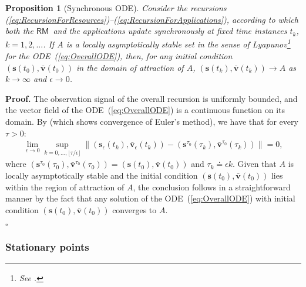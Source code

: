 \documentclass[letter,11pt]{article}
\newtheorem{proposition}{Proposition}[section]
\newenvironment{proof}{\textbf{Proof.}}{$\square$\\}
\begin{document}
\begin{proposition}[Synchronous ODE]		\label{Pr:LAS}
Consider the recursions (\ref{eq:RecursionForResources})--(\ref{eq:RecursionForApplications}), according to which both the {$\mathsf{RM}$}\ and the applications update synchronously at fixed time instances $t_k$, $k=1,2,...$. If $A$ is a locally asymptotically stable set in the sense of Lyapunov\footnote{See \cite[Definition~3.1]{Khalil92}.} for the ODE~(\ref{eq:OverallODE}), then, for any initial condition $({\mathbf{s}}(t_0),{\bar{\mathbf{v}}}(t_0))$ in the domain of attraction of $A$, $({\mathbf{s}}(t_k),{\bar{\mathbf{v}}}(t_k))\to{A}$ as $k\to\infty$ and $\epsilon\to{0}$.
\end{proposition}
\begin{proof}
  The observation signal of the overall recursion is uniformly bounded, and the vector field of the ODE~(\ref{eq:OverallODE}) is a continuous function on its domain. By \cite[Theorem~1.1]{Iserles09} (which shows convergence of Euler's method), we have that for every $\tau>0$:
  \begin{eqnarray*}
  \lim_{\epsilon\to{0}}\sup_{k=0,...,\lfloor{\tau/\epsilon}\rfloor}\|({\mathbf{s}}_{\epsilon}(t_k),{\bar{\mathbf{v}}}_{\epsilon}(t_k)) - ({\mathbf{s}}^{\tau_0}(\tau_k),{\bar{\mathbf{v}}}^{\tau_0}(\tau_k))\| = 0,
  \end{eqnarray*}
  where $({\mathbf{s}}^{\tau_0}(\tau_0),{\bar{\mathbf{v}}}^{\tau_0}(\tau_0)) = ({\mathbf{s}}(t_0),{\bar{\mathbf{v}}}(t_0))$ and $\tau_k{\doteq}\epsilon{k}$. Given that $A$ is locally asymptotically stable and the initial condition $({\mathbf{s}}(t_0),{\bar{\mathbf{v}}}(t_0))$ lies within the region of attraction of $A$, the conclusion follows in a straightforward manner by the fact that any solution of the ODE~(\ref{eq:OverallODE}) with initial condition $({\mathbf{s}}(t_0),{\bar{\mathbf{v}}}(t_0))$ converges to $A$.
  
  
  
  
  
  
  
  
  
  
  
  
  
\end{proof}

\subsubsection{Stationary points}
\label{sec:TD:SC:StationaryPoints}
\end{document}
